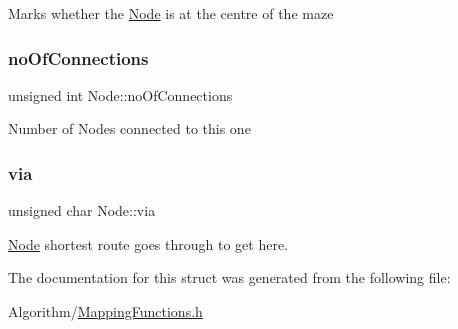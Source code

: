 Marks whether the \hyperlink{structNode}{Node} is at the centre of the maze \mbox{\label{structNode_a1ca0af175fe450a22f8d8625f0b58cbd}} 
\subsubsection{\texorpdfstring{no\+Of\+Connections}{noOfConnections}}
{\footnotesize\ttfamily unsigned int Node\+::no\+Of\+Connections}

Number of Nodes connected to this one \mbox{\label{structNode_a63fd18834461e80cc0ce292269f6f169}} 
\subsubsection{\texorpdfstring{via}{via}}
{\footnotesize\ttfamily unsigned char Node\+::via}

\hyperlink{structNode}{Node} shortest route goes through to get here. 

The documentation for this struct was generated from the following file\+:\begin{DoxyCompactItemize}
\item 
Algorithm/\hyperlink{MappingFunctions_8h}{Mapping\+Functions.\+h}\end{DoxyCompactItemize}

